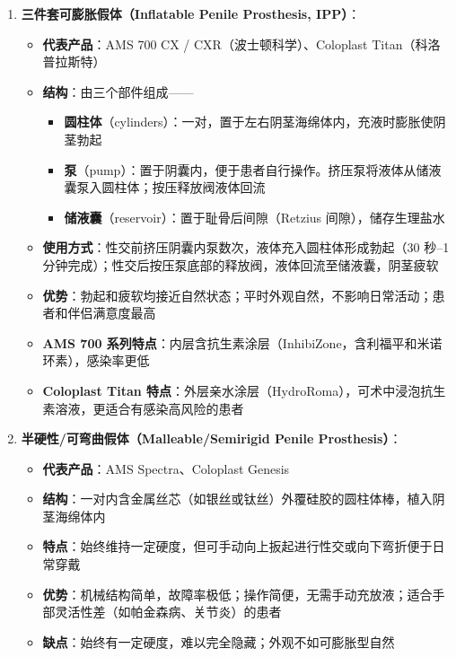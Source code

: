 \begin{enumerate}
	\item \textbf{三件套可膨胀假体（Inflatable Penile Prosthesis, IPP）}：
	\begin{itemize}
		\item \textbf{代表产品}：AMS 700 CX / CXR（波士顿科学）、Coloplast Titan（科洛普拉斯特）
		\item \textbf{结构}：由三个部件组成——
		\begin{itemize}
			\item \textbf{圆柱体}（cylinders）：一对，置于左右阴茎海绵体内，充液时膨胀使阴茎勃起
			\item \textbf{泵}（pump）：置于阴囊内，便于患者自行操作。挤压泵将液体从储液囊泵入圆柱体；按压释放阀液体回流
			\item \textbf{储液囊}（reservoir）：置于耻骨后间隙（Retzius 间隙），储存生理盐水
		\end{itemize}
		\item \textbf{使用方式}：性交前挤压阴囊内泵数次，液体充入圆柱体形成勃起（30 秒--1 分钟完成）；性交后按压泵底部的释放阀，液体回流至储液囊，阴茎疲软
		\item \textbf{优势}：勃起和疲软均接近自然状态；平时外观自然，不影响日常活动；患者和伴侣满意度最高
		\item \textbf{AMS 700 系列特点}：内层含抗生素涂层（InhibiZone，含利福平和米诺环素），感染率更低
		\item \textbf{Coloplast Titan 特点}：外层亲水涂层（HydroRoma），可术中浸泡抗生素溶液，更适合有感染高风险的患者
	\end{itemize}

	\item \textbf{半硬性/可弯曲假体（Malleable/Semirigid Penile Prosthesis）}：
	\begin{itemize}
		\item \textbf{代表产品}：AMS Spectra、Coloplast Genesis
		\item \textbf{结构}：一对内含金属丝芯（如银丝或钛丝）外覆硅胶的圆柱体棒，植入阴茎海绵体内
		\item \textbf{特点}：始终维持一定硬度，但可手动向上扳起进行性交或向下弯折便于日常穿戴
		\item \textbf{优势}：机械结构简单，故障率极低；操作简便，无需手动充放液；适合手部灵活性差（如帕金森病、关节炎）的患者
		\item \textbf{缺点}：始终有一定硬度，难以完全隐藏；外观不如可膨胀型自然
	\end{itemize}
\end{enumerate}

